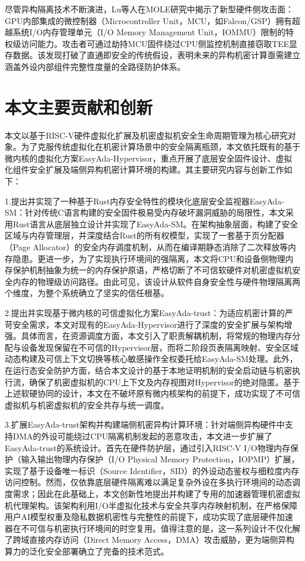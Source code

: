 \documentclass[master, vlined, review]{DissertUESTC}
\begin{document}
	尽管异构隔离技术不断演进，Lu等人在MOLE研究中揭示了新型硬件侧攻击面：GPU内部集成的微控制器（Microcontroller Unit，MCU，如Falcon/GSP）拥有超越系统I/O内存管理单元（I/O Memory Management Unit，IOMMU）限制的特权级访问能力。攻击者可通过劫持MCU固件绕过CPU侧监控机制直接窃取TEE显存数据。该发现打破了直通即安全的传统假设，表明未来的异构机密计算亟需建立涵盖外设内部组件完整性度量的全路径防护体系。
	
	\section{本文主要贡献和创新}
	本文以基于RISC-V硬件虚拟化扩展及机密虚拟机安全生命周期管理为核心研究对象。为了克服传统虚拟化在机密计算场景中的安全隔离瓶颈，本文依托既有的基于微内核的虚拟化方案EasyAda-Hypervisor，重点开展了底层安全固件设计、虚拟化组件安全扩展及端侧异构机密计算环境的构建。其主要研究内容与创新工作如下：
	
	1.提出并实现了一种基于Rust内存安全特性的模块化底层安全监视器EasyAda-SM：针对传统C语言构建的安全固件极易受内存破坏漏洞威胁的局限性，本文采用Rust语言从底层独立设计并实现了EasyAda-SM。在架构抽象层面，构建了安全区域与内存管理层，并深度结合Rust的所有权模型，实现了一套基于页分配器（Page Allocator）的安全内存调度机制，从而在编译期静态消除了二次释放等内存隐患。更进一步，为了实现执行环境间的强隔离，本文将CPU和设备侧物理内存保护机制抽象为统一的内存保护原语，严格切断了不可信软硬件对机密虚拟机安全内存的物理级访问路径。由此可见，该设计从软件自身安全性与硬件物理隔离两个维度，为整个系统确立了坚实的信任根基。
	
	2.提出并实现基于微内核的可信虚拟化方案EasyAda-trust：为适应机密计算的严苛安全需求，本文对现有的EasyAda-Hypervisor进行了深度的安全扩展与架构增强。具体而言，在资源调度方面，本文引入了职责解耦机制，将常规的物理内存分配与设备发现保留在不可信的Hypervisor层，而将二阶段页表隔离映射、安全区域动态构建及可信上下文切换等核心敏感操作全权委托给EasyAda-SM处理。此外，在运行态安全防护方面，结合本文设计的基于本地证明机制的安全启动链与机密执行流，确保了机密虚拟机的CPU上下文及内存视图对Hypervisor的绝对隐匿。基于上述软硬协同的设计，本文在不破坏原有微内核架构的前提下，成功实现了不可信虚拟机与机密虚拟机的安全共存与统一调度。
	
	3.扩展EasyAda-trust架构并构建端侧机密异构计算环境：针对端侧异构硬件中支持DMA的外设可能绕过CPU隔离机制发起的恶意攻击，本文进一步扩展了EasyAda-trust的系统设计。首先在硬件防护层，通过引入RISC-V I/O物理内存保护（输入输出物理内存保护（I/O Physical Memory Protection，IOPMP）扩展，实现了基于设备唯一标识（Source Identifier，SID）的外设动态鉴权与细粒度内存访问控制。然而，仅依靠底层硬件隔离难以满足复杂外设在多执行环境间的动态调度需求；因此在此基础上，本文创新性地提出并构建了专用的加速器管理机密虚拟机代理架构。该架构利用I/O半虚拟化技术与安全共享内存映射机制，在严格保障用户AI模型权重及隐私数据机密性与完整性的前提下，成功实现了底层硬件加速器在不可信与机密执行环境间的时空复用。值得注意的是，这一系列设计不仅化解了跨域直接内存访问（Direct Memory Access，DMA）攻击威胁，更为端侧异构算力的泛化安全部署确立了完备的技术范式。
	
\end{document}
